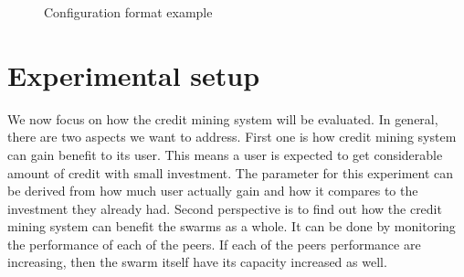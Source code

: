 \begin{figure}[h!]
	\fbox{\theverbbox}
	\caption{Configuration format example}
	\label{fig:gumbyconf}
\end{figure}

\section{Experimental setup}
\label{section:cmexp}
We now focus on how the credit mining system will be evaluated. In general, there are two aspects we want to address. First one is how credit mining system can gain benefit to its user. This means a user is expected to get considerable amount of credit with small investment. The parameter for this experiment can be derived from how much user actually gain and how it compares to the investment they already had. Second perspective is to find out how the credit mining system can benefit the swarms as a whole. It can be done by monitoring the performance of each of the peers. If each of the peers performance are increasing, then the swarm itself have its capacity increased as well.


